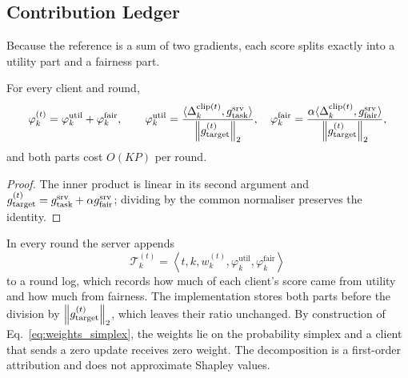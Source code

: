 \subsection{Contribution Ledger}
\label{subsec:governance}

Because the reference is a sum of two gradients, each score splits exactly into a utility part and a fairness part.

\begin{proposition}
\label{prop:linear_shapley}
For every client and round,
\begin{equation}
\label{eq:linear_decomp}
\varphi_k^{(t)} = \varphi_k^{\mathrm{util}} + \varphi_k^{\mathrm{fair}}, \qquad
\varphi_k^{\mathrm{util}} = \frac{\langle \Delta_k^{\mathrm{clip}(t)}, g_{\mathrm{task}}^{\mathrm{srv}} \rangle}{\left\lVert g_{\mathrm{target}}^{(t)} \right\rVert_2}, \quad
\varphi_k^{\mathrm{fair}} = \frac{\alpha \langle \Delta_k^{\mathrm{clip}(t)}, g_{\mathrm{fair}}^{\mathrm{srv}} \rangle}{\left\lVert g_{\mathrm{target}}^{(t)} \right\rVert_2},
\end{equation}
and both parts cost $O(KP)$ per round.
\end{proposition}
\begin{proof}
The inner product is linear in its second argument and $g_{\mathrm{target}}^{(t)} = g_{\mathrm{task}}^{\mathrm{srv}} + \alpha g_{\mathrm{fair}}^{\mathrm{srv}}$; dividing by the common normaliser preserves the identity.
\end{proof}

In every round the server appends
\begin{equation}
\label{eq:audit_tuple}
\mathcal{T}_k^{(t)} = \left\langle t, k, w_k^{(t)}, \varphi_k^{\mathrm{util}}, \varphi_k^{\mathrm{fair}} \right\rangle
\end{equation}
to a round log, which records how much of each client's score came from utility and how much from fairness. The implementation stores both parts before the division by $\left\lVert g_{\mathrm{target}}^{(t)} \right\rVert_2$, which leaves their ratio unchanged. By construction of Eq.~\eqref{eq:weights_simplex}, the weights lie on the probability simplex and a client that sends a zero update receives zero weight. The decomposition is a first-order attribution and does not approximate Shapley values.
